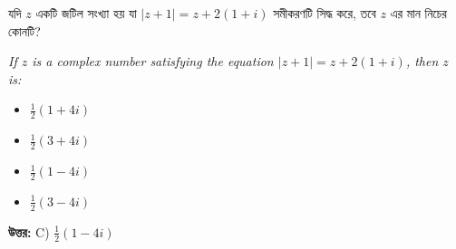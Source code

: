 \documentclass[12pt, a4paper]{article}
\begin{document}
\begin{tcolorbox}[questionbox={প্রশ্ন (Question) 6}]
    \noindent
    যদি $z$ একটি জটিল সংখ্যা হয় যা $|z+1| = z + 2(1+i)$ সমীকরণটি সিদ্ধ করে, তবে $z$ এর মান নিচের কোনটি?
    
    \vspace{0.8em}
    \begin{english}
    \noindent\textit{\color{darkgray}
    If $z$ is a complex number satisfying the equation $|z+1| = z + 2(1+i)$, then $z$ is:
    }
    \end{english}
\end{tcolorbox}

\begin{itemize}[label={}, leftmargin=1cm, itemsep=0.5em]
    \item[\textbf{A)}] $\frac{1}{2}(1 + 4i)$
    \item[\textbf{B)}] $\frac{1}{2}(3 + 4i)$
    \item[\textbf{C)}] $\frac{1}{2}(1 - 4i)$
    \item[\textbf{D)}] $\frac{1}{2}(3 - 4i)$
\end{itemize}

\vspace{0.5em}
\begin{tcolorbox}[answerbox]
    \textbf{\color{success} উত্তর:} C) $\frac{1}{2}(1 - 4i)$
\end{tcolorbox}
\vspace{1em}
\end{document}
